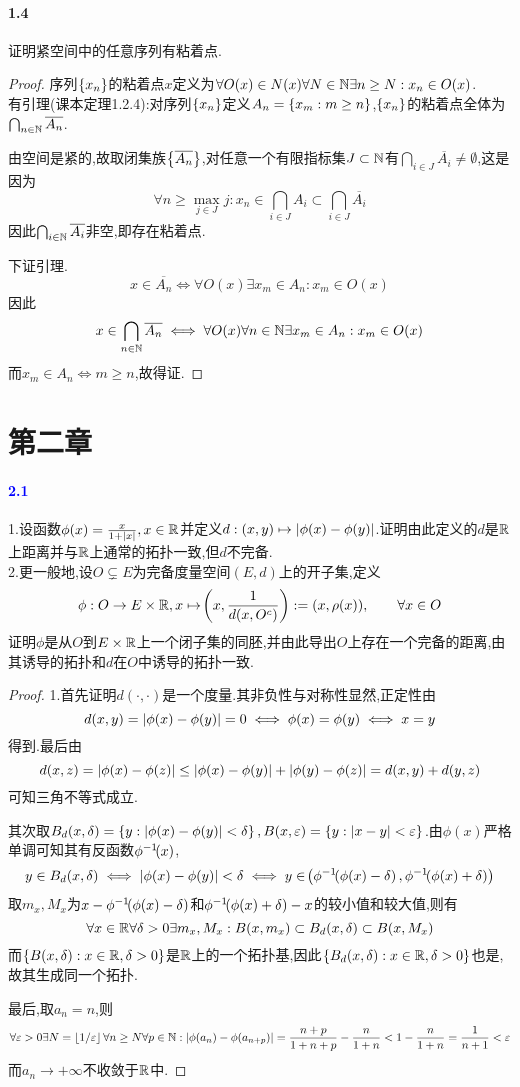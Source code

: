 \documentclass[UTF8]{article}
\newcommand{\parablue}[1]{\paragraph*{\textcolor{blue}{#1}}}
\begin{document}
\paragraph*{1.4}证明紧空间中的任意序列有粘着点.
\begin{proof}
    序列$\left\{x_n\right\}$的粘着点$x$定义为$\forall O(x)\in N(x)\forall N\in\mathbb{N}\exists n\geq N:x_n\in O(x)$.\\
    有引理(课本定理1.2.4):对序列$\left\{x_n\right\}$定义$A_n=\left\{x_m:m\geq n\right\}$,$\left\{x_n\right\}$的粘着点全体为$\bigcap_{n\in \mathbb{N}}\overline{A_n}$.

    由空间是紧的,故取闭集族$\left\{\overline{A_n}\right\}$,对任意一个有限指标集$J\subset \mathbb{N}$有$\bigcap_{i\in J}\overline{A_i}\neq \emptyset$,这是因为$$\forall n\geq \max_{j\in J} j:x_n\in \bigcap_{i\in J}A_i\subset \bigcap_{i\in J}\overline{A_i}$$
    因此$\bigcap_{i\in \mathbb{N}}\overline{A_i}$非空,即存在粘着点.

    下证引理.$$x\in \overline{A_n}\iff \forall O(x)\exists x_m\in A_n:x_m\in O(x)$$
    因此$$x\in \bigcap_{n\in \mathbb{N}}\overline{A_n}\iff \forall O(x)\forall n\in \mathbb{N}\exists x_m\in A_n:x_m\in O(x)$$
    而$x_m\in A_n\iff m\geq n$,故得证.
\end{proof}

\newpage
\section{第二章}
\parablue{2.1}1.设函数$ \phi(x)=\frac{x}{1+|x|},x\in \mathbb{R}$并定义$d:(x,y)\mapsto \left|\phi(x)-\phi(y)\right|$.证明由此定义的$d$是$\mathbb{R}$上距离并与$\mathbb{R}$上通常的拓扑一致,但$d$不完备.\\
2.更一般地,设$O\subsetneq E$为完备度量空间$(E,d)$上的开子集,定义$$\phi:O\to E\times \mathbb{R}, x\mapsto \!\left(x,\frac{1}{d(x,O^c)}\right):=(x,\rho(x)),\qquad \forall x\in O$$
证明$\phi$是从$O$到$E\times \mathbb{R}$上一个闭子集的同胚,并由此导出$O$上存在一个完备的距离,由其诱导的拓扑和$d$在$O$中诱导的拓扑一致.
\begin{proof}
    1.首先证明$d(\cdot,\cdot)$是一个度量.其非负性与对称性显然,正定性由$$d(x,y)=\left|\phi(x)-\phi(y)\right|=0\iff \phi(x)=\phi(y)\iff x=y$$得到.最后由
    $$d(x,z)=\left|\phi(x)-\phi(z)\right|\leq \left|\phi(x)-\phi(y)\right|+\left|\phi(y)-\phi(z)\right|=d(x,y)+d(y,z)$$可知三角不等式成立.

    其次取$ B_d(x,\delta)=\left\{y:\left|\phi(x)-\phi(y)\right|<\delta\right\}, B(x,\varepsilon)=\left\{y:\left|x-y\right|<\varepsilon\right\}$.由$\phi(x)$严格单调可知其有反函数$\phi^{-1}\!(x)$,$$y\in B_d(x,\delta)\iff \left|\phi(x)-\phi(y)\right|<\delta\iff y\in \!\left(\phi^{-1}\!\!\left(\phi(x)-\delta\right),\phi^{-1}\!\!\left(\phi(x)+\delta\right)\right)$$
    取$m_x,M_x$为$x-\phi^{-1}\!\!\left(\phi(x)-\delta\right)$和$\phi^{-1}\!\!\left(\phi(x)+\delta\right)-x$的较小值和较大值,则有$$\forall x\in \mathbb{R} \forall \delta>0 \exists m_x,M_x: B(x,m_x)\subset B_d(x,\delta)\subset B(x,M_x)$$
    而$\left\{B(x,\delta):x\in \mathbb{R},\delta>0\right\}$是$\mathbb{R}$上的一个拓扑基,因此$\left\{B_d(x,\delta):x\in \mathbb{R},\delta>0\right\}$也是,故其生成同一个拓扑.

    最后,取$a_n=n$,则$$\forall \varepsilon>0\exists N=\left\lfloor1/\varepsilon\right\rfloor\forall n\geq N\forall p\in \mathbb{N}:\left|\phi(a_n)-\phi(a_{n+p})\right|=\frac{n+p}{1+n+p}-\frac{n}{1+n}<1-\frac{n}{1+n}=\dfrac{1}{n+1}<\varepsilon$$
    而$a_n\to +\infty$不收敛于$\mathbb{R}$中.
\end{proof}
\end{document}
